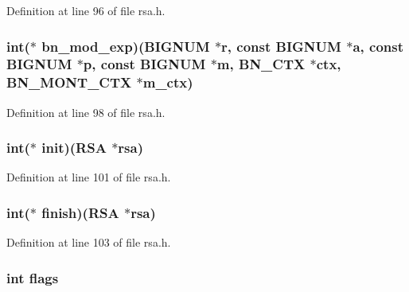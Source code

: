Definition at line 96 of file rsa.\+h.

\subsubsection[{\texorpdfstring{bn\+\_\+mod\+\_\+exp}{bn_mod_exp}}]{\setlength{\rightskip}{0pt plus 5cm}int($\ast$ bn\+\_\+mod\+\_\+exp)({\bf B\+I\+G\+N\+UM} $\ast$r, const {\bf B\+I\+G\+N\+UM} $\ast${\bf a}, const {\bf B\+I\+G\+N\+UM} $\ast${\bf p}, const {\bf B\+I\+G\+N\+UM} $\ast$m, {\bf B\+N\+\_\+\+C\+TX} $\ast$ctx, {\bf B\+N\+\_\+\+M\+O\+N\+T\+\_\+\+C\+TX} $\ast$m\+\_\+ctx)}\hypertarget{structrsa__meth__st_a7a6152fcea56bc6f6e4c8134595bc5e4}{}\label{structrsa__meth__st_a7a6152fcea56bc6f6e4c8134595bc5e4}


Definition at line 98 of file rsa.\+h.

\subsubsection[{\texorpdfstring{init}{init}}]{\setlength{\rightskip}{0pt plus 5cm}int($\ast$ init)({\bf R\+SA} $\ast$rsa)}\hypertarget{structrsa__meth__st_a654dcfa150efa134b91bc4746288bc14}{}\label{structrsa__meth__st_a654dcfa150efa134b91bc4746288bc14}


Definition at line 101 of file rsa.\+h.

\subsubsection[{\texorpdfstring{finish}{finish}}]{\setlength{\rightskip}{0pt plus 5cm}int($\ast$ finish)({\bf R\+SA} $\ast$rsa)}\hypertarget{structrsa__meth__st_a9cc8f4b4cacef59237fd998e65c0c4da}{}\label{structrsa__meth__st_a9cc8f4b4cacef59237fd998e65c0c4da}


Definition at line 103 of file rsa.\+h.

\subsubsection[{\texorpdfstring{flags}{flags}}]{\setlength{\rightskip}{0pt plus 5cm}int flags}\hypertarget{structrsa__meth__st_ac8bf36fe0577cba66bccda3a6f7e80a4}{}\label{structrsa__meth__st_ac8bf36fe0577cba66bccda3a6f7e80a4}


